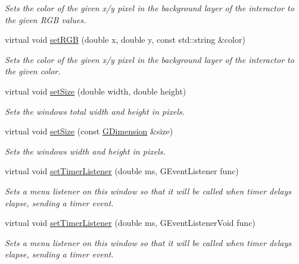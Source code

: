 \begin{DoxyCompactItemize}
\begin{DoxyCompactList}\small\item\em Sets the color of the given x/y pixel in the background layer of the interactor to the given R\+GB values. \end{DoxyCompactList}\item 
virtual void \mbox{\hyperlink{classGDrawingSurface_ae9a228792d4bb4b628350f39eaa3ad12}{set\+R\+GB}} (double x, double y, const std\+::string \&color)
\begin{DoxyCompactList}\small\item\em Sets the color of the given x/y pixel in the background layer of the interactor to the given color. \end{DoxyCompactList}\item 
virtual void \mbox{\hyperlink{classGWindow_aca25d49481f9bf5fc8f7df4c086c4ce7}{set\+Size}} (double width, double height)
\begin{DoxyCompactList}\small\item\em Sets the window\textquotesingle{}s total width and height in pixels. \end{DoxyCompactList}\item 
virtual void \mbox{\hyperlink{classGWindow_ae2b628228f192c2702c4ce941b2af68f}{set\+Size}} (const \mbox{\hyperlink{structGDimension}{G\+Dimension}} \&size)
\begin{DoxyCompactList}\small\item\em Sets the window\textquotesingle{}s width and height in pixels. \end{DoxyCompactList}\item 
virtual void \mbox{\hyperlink{classGWindow_ae0d5df4c2ed47156cbba7da55362e4e1}{set\+Timer\+Listener}} (double ms, G\+Event\+Listener func)
\begin{DoxyCompactList}\small\item\em Sets a menu listener on this window so that it will be called when timer delays elapse, sending a timer event. \end{DoxyCompactList}\item 
virtual void \mbox{\hyperlink{classGWindow_ae23e03c86580bbcefc2dee4d01d08091}{set\+Timer\+Listener}} (double ms, G\+Event\+Listener\+Void func)
\begin{DoxyCompactList}\small\item\em Sets a menu listener on this window so that it will be called when timer delays elapse, sending a timer event. \end{DoxyCompactList}\item 

\end{DoxyCompactItemize}
